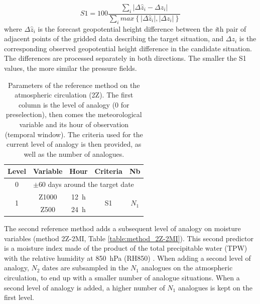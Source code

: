 \documentclass[hess]{copernicus}
\begin{document}
\begin{equation}
\label{eq:S1}
S1=100 \frac {\displaystyle \sum_{i} \vert \Delta\hat{z}_{i} - \Delta z_{i} \vert}
{\displaystyle \sum_{i} max\left\lbrace \vert \Delta\hat{z}_{i} \vert , \vert \Delta z_{i} \vert \right\rbrace }
\end{equation}
where $\Delta \hat{z}_{i}$ is the forecast geopotential height difference between the \textit{i}th pair of adjacent points of the gridded data describing the target situation, and $\Delta z_{i}$ is the corresponding observed geopotential height difference in the candidate situation. The differences are processed separately in both directions. The smaller the S1 values, the more similar the pressure fields.

\begin{table}[htb]
	\caption{Parameters of the reference method on the atmospheric circulation (2Z). The first column is the level of analogy (0 for preselection), then comes the meteorological variable and its hour of observation (temporal window). The criteria used for the current level of analogy is then provided, as well as the number of analogues.}
	\footnotesize
	\begin{center}
		\begin{tabular}{ccccc}
			\hline
			Level & Variable & Hour & Criteria & Nb \\ 
			\hline 
			0 & \multicolumn{4}{l}{$\pm 60$ days around the target date} \\
			\hline 
			\multirow{2}{*}{1} & Z1000 & 12~h & \multirow{2}{*}{S1} & \multirow{2}{*}{$N_{1}$} \\
			& Z500 & 24~h & & \\ 
			\hline 
		\end{tabular} 
	\end{center}
	\label{table:method_2Z}
\end{table}

The second reference method adds a subsequent level of analogy on moisture variables (method 2Z-2MI, Table \ref{table:method_2Z-2MI}). This second predictor is a moisture index made of the product of the total precipitable water (TPW) with the relative humidity at 850~hPa (RH850) \citep{Bontron2004}. When adding a second level of analogy, $N_{2}$ dates are subsampled in the $N_{1}$ analogues on the atmospheric circulation, to end up with a smaller number of analogue situations. When a second level of analogy is added, a higher number of $N_{1}$ analogues is kept on the first level.
\end{document}
